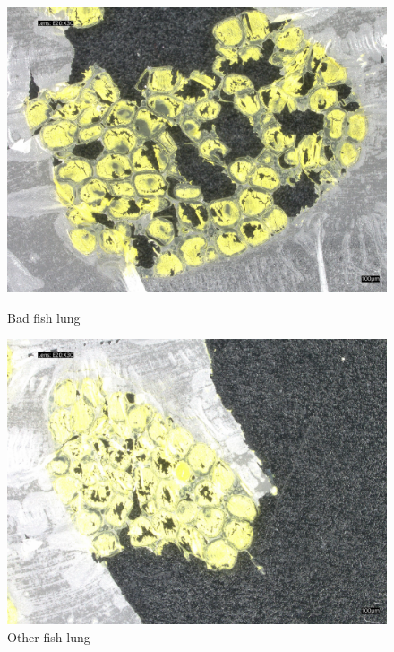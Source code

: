 \begin{figure}[H]
\begin{minipage}{0.24\textwidth}
        \centering
        \includegraphics[width=\textwidth]{./fig/fish_lung/bad20240313_140952.jpg}
        \caption{Bad fish lung}
        \label{fig:bad_fish_lung}
    \end{minipage}
    \begin{minipage}{0.24\textwidth}
        \centering
        \includegraphics[width=\textwidth]{./fig/fish_lung/other20240313_141858.jpg}
        \caption{Other fish lung}
        \label{fig:other_fish_lung}
    \end{minipage}
\end{figure}

